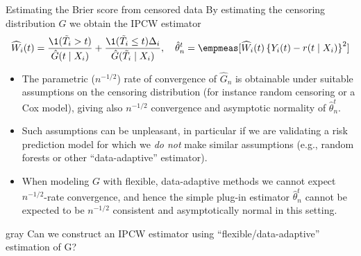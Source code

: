 \documentclass[handout]{beamer}\usepackage{listings}
\begin{document}
\begin{frame}[label={sec:org1f68676}]{Estimating the Brier score from censored data}
\small
By estimating the censoring distribution \(G\) we obtain the IPCW estimator
\begin{equation*}
  \widehat{W}_i(t)=\frac{\1({\tilde{T}_i >t})}{\hat{G}(t \mid X_i)} + \frac{\1({\tilde{T}_i\leq
      t})\Delta_i}{\hat{G}(\tilde{T}_i\mid X_i)},
  \quad \hat{\theta}_n^t = \empmeas[\widehat{W}_i(t)
  \left\{
    Y_i(t) - r(t \mid X_i)
  \right\}^2]
\end{equation*}

\vfill \pause
\begin{itemize}
\item The parametric (\(n^{-1/2}\)) rate of convergence of \(\hat G_n\) is obtainable under suitable
assumptions on the censoring distribution (for instance random censoring or a Cox model),
giving also \(n^{-1/2}\) convergence and asymptotic normality of \(\hat\theta^t_n\). \pause
\item Such assumptions can be unpleasant, in particular if we are validating a risk prediction model
for which we \emph{do not} make similar assumptions (e.g., random forests or other ``data-adaptive''
estimator). \pause
\item When modeling \(G\) with flexible, data-adaptive methods we cannot expect \(n^{-1/2}\)-rate
convergence, and hence the simple plug-in estimator \(\hat\theta^t_n\) cannot be expected to be
\(n^{-1/2}\) consistent and asymptotically normal in this setting. \pause
	 \vfill
\end{itemize}

\begin{beamercolorbox}[rounded=true]{gray}
\normalsize \centering Can we construct an IPCW estimator using ``flexible/data-adaptive''
estimation of G?
\end{beamercolorbox}
\end{frame}
\end{document}
